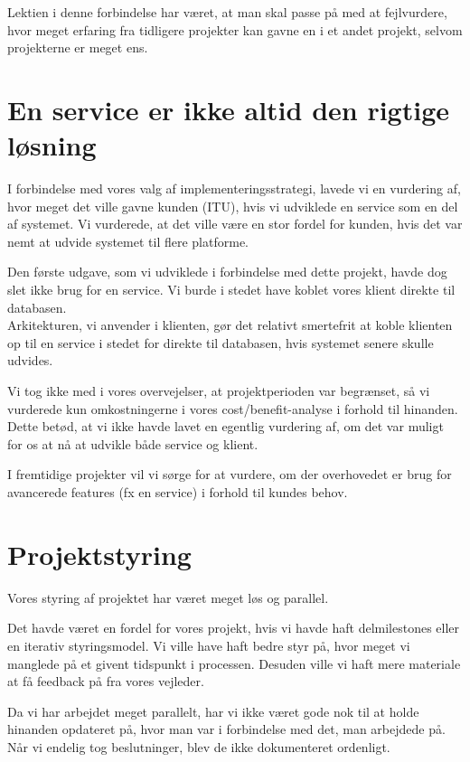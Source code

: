 Lektien i denne forbindelse har været, at man skal passe på med at fejlvurdere, hvor meget erfaring fra tidligere projekter kan gavne en i et andet projekt, selvom projekterne er meget ens.

\section{En service er ikke altid den rigtige løsning}
\label{Lessons_Service}
I forbindelse med vores valg af implementeringsstrategi, lavede vi en vurdering af, hvor meget det ville gavne kunden (ITU), hvis vi udviklede en service som en del af systemet. Vi vurderede, at det ville være en stor fordel for kunden, hvis det var nemt at udvide systemet til flere platforme.

Den første udgave, som vi udviklede i forbindelse med dette projekt, havde dog slet ikke brug for en service. Vi burde i stedet have koblet vores klient direkte til databasen. 
\\Arkitekturen, vi anvender i klienten, gør det relativt smertefrit at koble klienten op til en service i stedet for direkte til databasen, hvis systemet senere skulle udvides.

Vi tog ikke med i vores overvejelser, at projektperioden var begrænset, så vi vurderede kun omkostningerne i vores cost/benefit-analyse i forhold til hinanden. Dette betød, at vi ikke havde lavet en egentlig vurdering af, om det var muligt for os at nå at udvikle både service og klient.

I fremtidige projekter vil vi sørge for at vurdere, om der overhovedet er brug for avancerede features (fx en service) i forhold til kundes behov.

\section{Projektstyring}
\label{Lessons_Styring}
Vores styring af projektet har været meget løs og parallel. 

Det havde været en fordel for vores projekt, hvis vi havde haft delmilestones eller en iterativ styringsmodel. Vi ville have haft bedre styr på, hvor meget vi manglede på et givent tidspunkt i processen. Desuden ville vi haft mere materiale at få feedback på fra vores vejleder.

Da vi har arbejdet meget parallelt, har vi ikke været gode nok til at holde hinanden opdateret på, hvor man var i forbindelse med det, man arbejdede på. Når vi endelig tog beslutninger, blev de ikke dokumenteret ordenligt.


